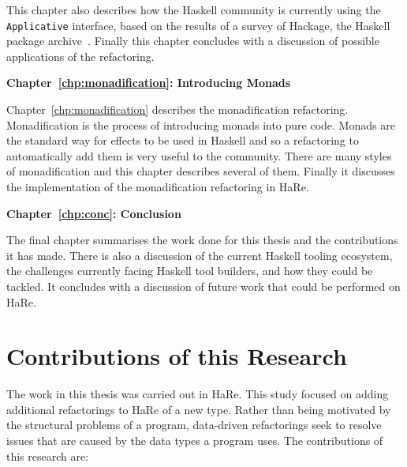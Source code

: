 This chapter also describes how the Haskell community is currently using the\\ \texttt{Applicative} interface, based on the results of a survey of Hackage, the Haskell package archive~\citep{hackage}. Finally this chapter concludes with a discussion of possible applications of the refactoring.

\textbf{Chapter~\ref{chp:monadification}: Introducing Monads} 

Chapter~\ref{chp:monadification} describes the monadification refactoring. Monadification is the process of introducing monads into pure code. Monads are the standard way for effects to be used in Haskell and so a refactoring to automatically add them is very useful to the community. There are many styles of monadification and this chapter describes several of them. Finally it discusses the implementation of the monadification refactoring in HaRe.

\textbf{Chapter~\ref{chp:conc}: Conclusion}

The final chapter summarises the work done for this thesis and the contributions it has made. There is also a discussion of the current Haskell tooling ecosystem, the challenges currently facing Haskell tool builders, and how they could be tackled. It concludes with a discussion of future work that could be performed on HaRe.

\section{Contributions of this Research}

The work in this thesis was carried out in HaRe. This study focused on adding additional refactorings to HaRe of a new type. Rather than being motivated by the structural problems of a program, data-driven refactorings seek to resolve issues that are caused by the data types a program uses. The contributions of this research are:

